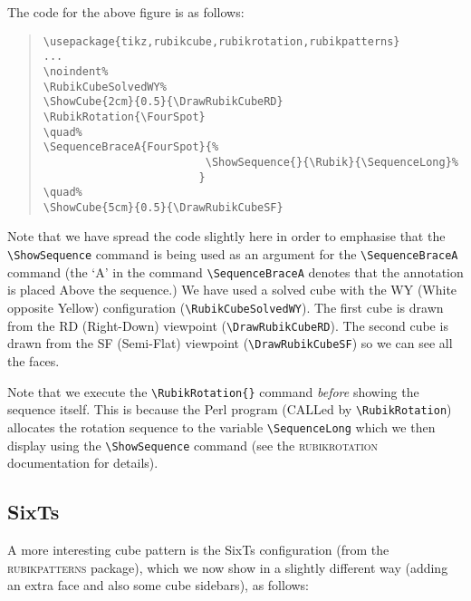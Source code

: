 \documentclass[a4paper]{article}
\newcommand{\CornerRotation}{[CornerRotation],Up,Rp,Dp,R,U,Rp,D,R}
\begin{document}
\bigskip

\noindent%
\RubikCubeSolvedWY%
\RubikRotation{\CornerRotation}
\quad%
\quad%

\bigskip

{\noindent}The code for the above figure is as follows:


\begin{quote}
\begin{verbatim}
\usepackage{tikz,rubikcube,rubikrotation,rubikpatterns}
...
\noindent%
\RubikCubeSolvedWY%
\ShowCube{2cm}{0.5}{\DrawRubikCubeRD}
\RubikRotation{\FourSpot}
\quad%
\SequenceBraceA{FourSpot}{%
                         \ShowSequence{}{\Rubik}{\SequenceLong}%
                        }
\quad%
\ShowCube{5cm}{0.5}{\DrawRubikCubeSF}
\end{verbatim} 
\end{quote}
Note that we have spread  the code slightly here in order to emphasise that 
the \verb!\ShowSequence! command is being used as an argument for the 
\verb!\SequenceBraceA! command (the `A' in the command \verb!\SequenceBraceA! 
denotes that the annotation is placed Above the sequence.)
We have used a solved cube with the WY (White opposite Yellow) 
configuration (\verb!\RubikCubeSolvedWY!).
The first cube is drawn from the  RD (Right-Down) viewpoint (\verb!\DrawRubikCubeRD!).
The second cube is drawn from the SF (Semi-Flat)  viewpoint (\verb!\DrawRubikCubeSF!) 
so we can see all the faces.

Note that we execute the \verb!\RubikRotation{}! command \textit{before} showing 
the sequence itself. This is because the Perl program (CALLed by 
\verb!\RubikRotation!) allocates the rotation sequence to the variable 
\verb!\SequenceLong! which we then display using the \verb!\ShowSequence! command 
(see the \textsc{rubikrotation} documentation for details).


\pagebreak 

\subsection{SixTs}

A  more interesting cube pattern  is the SixTs configuration (from the 
\textsc{rubikpatterns} package),  which we  now show in a slightly 
different way (adding an extra face and also some cube sidebars), as follows:
\end{document}
